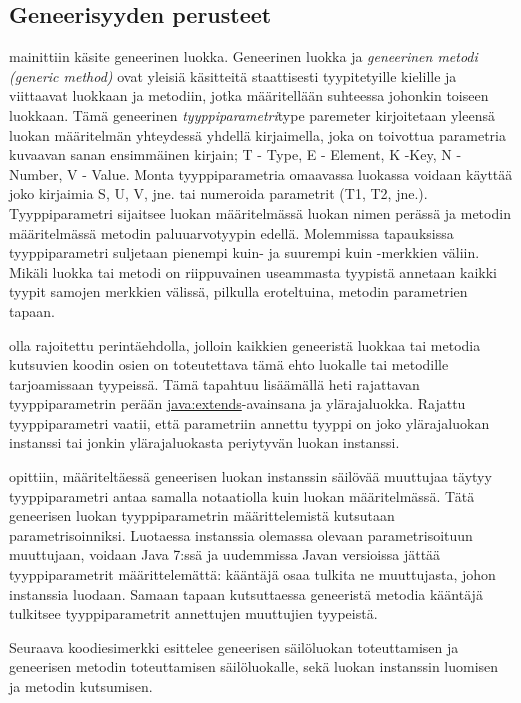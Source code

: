 \documentclass{tufte-book}
\newcommand{\eng}[1]{\textit{(#1)}}
\newcommand{\new}[1]{\textit{\gls{#1}}}
\newcommand{\neweng}[2]{\new{#1} \eng{#2}}
\newcommand{\java}[1]{\underline{\gls{java:#1}}}
\begin{document}
\subsection{Geneerisyyden perusteet}
\label{genericBasics}

  mainittiin käsite \gls{geneerinen luokka}. 
Geneerinen luokka ja \neweng{geneerinen metodi}{generic method} ovat yleisiä käsitteitä
staattisesti tyypitetyille kielille ja viittaavat luokkaan ja metodiin, jotka määritellään
suhteessa johonkin toiseen luokkaan. Tämä geneerinen \new{tyyppiparametri}{type paremeter}
kirjoitetaan yleensä luokan määritelmän yhteydessä yhdellä kirjaimella, joka on toivottua
parametria kuvaavan sanan ensimmäinen kirjain; T - Type, E - Element, K -Key, N - Number, V -
Value. Monta tyyppiparametria omaavassa luokassa voidaan käyttää joko kirjaimia S, U, V, jne. tai
numeroida parametrit (T1, T2, jne.). Tyyppiparametri sijaitsee luokan määritelmässä luokan nimen
perässä ja metodin määritelmässä metodin paluuarvotyypin edellä. Molemmissa tapauksissa
tyyppiparametri suljetaan pienempi kuin- ja suurempi kuin -merkkien väliin. Mikäli luokka tai
metodi on riippuvainen useammasta tyypistä annetaan kaikki tyypit samojen merkkien välissä,
pilkulla eroteltuina, metodin parametrien tapaan. 

 olla rajoitettu perintäehdolla, jolloin kaikkien
geneeristä luokkaa tai metodia kutsuvien koodin osien on toteutettava tämä ehto luokalle tai
metodille tarjoamissaan tyypeissä. Tämä tapahtuu lisäämällä heti rajattavan tyyppiparametrin
perään \java{extends}-avainsana ja ylärajaluokka. Rajattu tyyppiparametri vaatii, että parametriin
annettu tyyppi on joko ylärajaluokan instanssi tai jonkin ylärajaluokasta periytyvän luokan
instanssi.

  opittiin, määriteltäessä geneerisen luokan
instanssin säilövää muuttujaa täytyy tyyppiparametri antaa samalla notaatiolla kuin luokan
määritelmässä. Tätä geneerisen luokan tyyppiparametrin määrittelemistä kutsutaan
parametrisoinniksi. Luotaessa instanssia olemassa olevaan parametrisoituun muuttujaan, voidaan
Java 7:ssä ja uudemmissa Javan versioissa jättää tyyppiparametrit määrittelemättä: kääntäjä osaa
tulkita ne muuttujasta, johon instanssia luodaan. Samaan tapaan kutsuttaessa geneeristä metodia
kääntäjä tulkitsee tyyppiparametrit annettujen muuttujien tyypeistä.

Seuraava koodiesimerkki esittelee
geneerisen säilöluokan toteuttamisen ja geneerisen metodin toteuttamisen säilöluokalle, sekä
luokan instanssin luomisen ja metodin kutsumisen.
\end{document}
